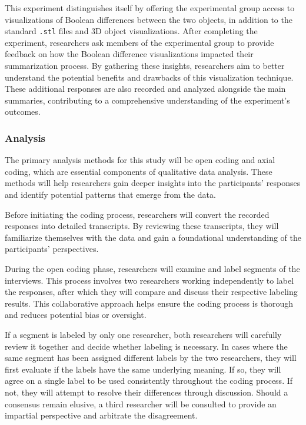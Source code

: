 \documentclass[sigconf,authorversion,nonacm]{acmart}
\begin{document}
This experiment distinguishes itself by offering the experimental group access to visualizations of Boolean differences between the two objects, in addition to the standard \texttt{.stl} files and 3D object visualizations.
After completing the experiment, researchers ask members of the experimental group to provide feedback on how the Boolean difference visualizations impacted their summarization process.
By gathering these insights, researchers aim to better understand the potential benefits and drawbacks of this visualization technique.
These additional responses are also recorded and analyzed alongside the main summaries, contributing to a comprehensive understanding of the experiment's outcomes.

\subsubsection{Analysis}
The primary analysis methods for this study will be open coding and axial coding, which are essential components of qualitative data analysis. These methods will help researchers gain deeper insights into the participants' responses and identify potential patterns that emerge from the data.

Before initiating the coding process, researchers will convert the recorded responses into detailed transcripts. By reviewing these transcripts, they will familiarize themselves with the data and gain a foundational understanding of the participants' perspectives.

During the open coding phase, researchers will examine and label segments of the interviews. This process involves two researchers working independently to label the responses, after which they will compare and discuss their respective labeling results.
This collaborative approach helps ensure the coding process is thorough and reduces potential bias or oversight.

If a segment is labeled by only one researcher, both researchers will carefully review it together and decide whether labeling is necessary. In cases where the same segment has been assigned different labels by the two researchers,
they will first evaluate if the labels have the same underlying meaning. If so, they will agree on a single label to be used consistently throughout the coding process.
If not, they will attempt to resolve their differences through discussion. Should a consensus remain elusive, a third researcher will be consulted to provide an impartial perspective and arbitrate the disagreement.
\end{document}
